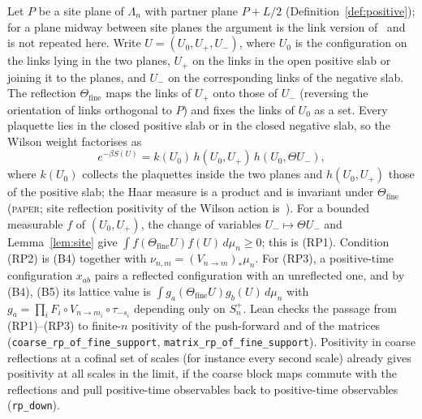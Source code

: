 \documentclass[11pt,a4paper]{article}
\theoremstyle{definition}
\theoremstyle{remark}
\newcommand{\tagP}{\textsc{paper}}
\newcommand{\lt}[1]{\texttt{#1}}
\begin{document}
Let $P$ be a site plane of $\Lambda_n$ with partner plane $P+L/2$ (Definition~\ref{def:positive}); for a plane midway between site planes the argument is the link version of~\cite{OSe} and is not repeated here. Write $U=(U_0,U_+,U_-)$, where $U_0$ is the configuration on the links lying in the two planes, $U_+$ on the links in the open positive slab or joining it to the planes, and $U_-$ on the corresponding links of the negative slab. The reflection $\Theta_{\mathrm{fine}}$ maps the links of $U_+$ onto those of $U_-$ (reversing the orientation of links orthogonal to $P$) and fixes the links of $U_0$ as a set. Every plaquette lies in the closed positive slab or in the closed negative slab, so the Wilson weight factorises as
\[
e^{-\beta S(U)}=k(U_0)\,h(U_0,U_+)\,h(U_0,\Theta U_-),
\]
where $k(U_0)$ collects the plaquettes inside the two planes and $h(U_0,U_+)$ those of the positive slab; the Haar measure is a product and is invariant under $\Theta_{\mathrm{fine}}$ (\tagP; site reflection positivity of the Wilson action is~\cite{OSe}). For a bounded measurable $f$ of $(U_0,U_+)$, the change of variables $U_-\mapsto\Theta U_-$ and Lemma~\ref{lem:site} give $\int f(\Theta_{\mathrm{fine}}U)f(U)\,d\mu_n\ge0$; this is (RP1). Condition (RP2) is (B4) together with $\nu_{n,m}=(V_{n\to m})_*\mu_n$. For (RP3), a positive-time configuration $x_{ab}$ pairs a reflected configuration with an unreflected one, and by (B4), (B5) its lattice value is $\int g_a(\Theta_{\mathrm{fine}}U)g_b(U)\,d\mu_n$ with $g_a=\prod_iF_i\circ V_{n\to m_i}\circ\tau_{-s_i}$ depending only on $S_n^+$. Lean checks the passage from (RP1)--(RP3) to finite-$n$ positivity of the push-forward and of the matrices (\lt{coarse\_\allowbreak{}rp\_\allowbreak{}of\_\allowbreak{}fine\_\allowbreak{}support}, \lt{matrix\_\allowbreak{}rp\_\allowbreak{}of\_\allowbreak{}fine\_\allowbreak{}support}). Positivity in coarse reflections at a cofinal set of scales (for instance every second scale) already gives positivity at all scales in the limit, if the coarse block maps commute with the reflections and pull positive-time observables back to positive-time observables (\lt{rp\_\allowbreak{}down}).
\end{document}
